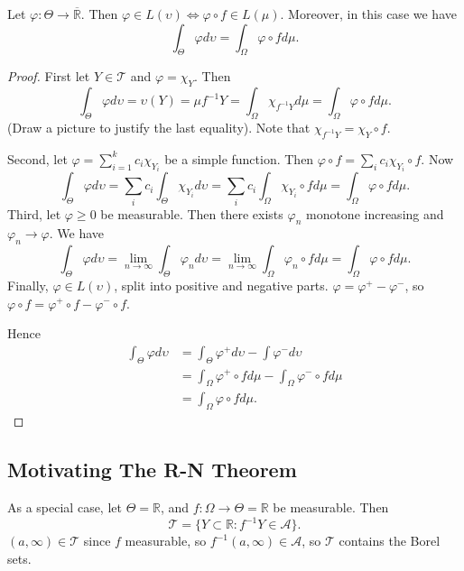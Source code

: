 \begin{theorem}
	Let $\varphi: \Theta \to  \overline{\mathbb{R}} $. Then $\varphi \in L(\upsilon) \iff \varphi \circ f \in L(\mu)$. Moreover, in this case we have
	\[
		\int _\Theta \varphi d \upsilon =
		\int _\Omega \varphi \circ f d \mu
	.\] 
\end{theorem}
\begin{proof}
	First let $Y \in \mathcal{T}$ and $\varphi = \chi_Y$. Then
	\[
		\int _\Theta \varphi d \upsilon = \upsilon(Y) = \mu f^{-1} Y = \int _\Omega \chi_{f^{-1} Y} d\mu = \int _\Omega \varphi \circ f d \mu
	.\] 
	(Draw a picture to justify the last equality). Note that $\chi_{f^{-1} Y} = \chi_Y \circ f$.

	Second, let $\varphi = \sum_{i=1}^k c_i \chi_{Y_i}$ be a simple function. Then $\varphi \circ f = \sum_i c_i \chi_{Y_i} \circ f$. Now
	\[
		\int _\Theta \varphi d \upsilon = \sum_i c_i \int _\Theta \chi_{Y_i} d \upsilon = \sum_i c_i \int _\Omega \chi_{Y_i} \circ f d \mu = \int _\Omega \varphi\circ f d \mu
	.\] 
	Third, let $\varphi\ge 0$ be measurable. Then there exists $\varphi_n$ monotone increasing and $\varphi_n \to  \varphi$. We have
	\[
		\int _\Theta \varphi d \upsilon = \lim_{n \to  \infty } \int _\Theta \varphi_n d \upsilon = \lim_{n \to \infty} \int _\Omega \varphi_n \circ f d \mu = \int _\Omega \varphi \circ f d \mu
	.\] 
	Finally, $\varphi \in L(\upsilon)$, split into positive and negative parts. $\varphi = \varphi^+ - \varphi^-$, so $\varphi \circ f = \varphi^+ \circ f - \varphi^- \circ f$.

	Hence
	\begin{align*}
		\int _\Theta \varphi d \upsilon &= \int _\Theta \varphi^+ d \upsilon - \int \varphi^- d \upsilon\\
		&= \int _\Omega \varphi^+ \circ f d \mu - \int _\Omega \varphi^- \circ f d \mu \\
		&= \int _\Omega \varphi \circ f d \mu 
	.\end{align*} 

\end{proof}

\subsection{Motivating The R-N Theorem}

As a special case, let $\Theta = \mathbb{R}$, and $f : \Omega \to  \Theta = \mathbb{R}$ be measurable. Then
\[
	\mathcal{T} = \{Y \subset \mathbb{R} : f^{-1} Y \in \mathcal{A}\}
.\] 
$(a, \infty ) \in \mathcal{T}$ since $f$ measurable, so $f^{-1} (a, \infty ) \in \mathcal{A}$, so $\mathcal{T}$ contains the Borel sets.

